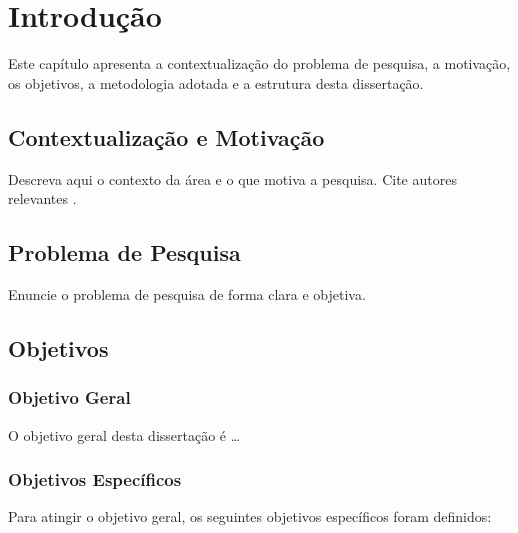 
\chapter{Introdução}
\label{cap:introducao}

Este capítulo apresenta a contextualização do problema de pesquisa,
a motivação, os objetivos, a metodologia adotada e a estrutura
desta dissertação.


\section{Contextualização e Motivação}
\label{sec:contextualizacao}

Descreva aqui o contexto da área e o que motiva a pesquisa.
Cite autores relevantes \cite{exemplo2023}.

\section{Problema de Pesquisa}
\label{sec:problema}

Enuncie o problema de pesquisa de forma clara e objetiva.

\section{Objetivos}
\label{sec:objetivos}

\subsection{Objetivo Geral}

O objetivo geral desta dissertação é \ldots

\subsection{Objetivos Específicos}

Para atingir o objetivo geral, os seguintes objetivos específicos
foram definidos:

